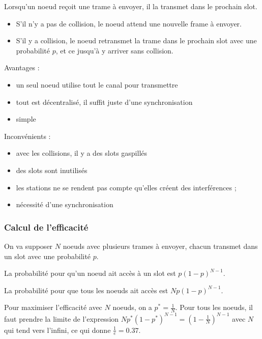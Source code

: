 	Lorsqu'un noeud reçoit une trame à envoyer, il la transmet dans le prochain slot. 
	
	\begin{itemize}
		\item S'il n'y a pas de collision, le noeud attend une nouvelle frame à envoyer. 
		\item S'il y a collision, le noeud retransmet la trame dans le prochain slot avec une probabilité $p$, et ce jusqu'à y arriver sans collision.
	\end{itemize}
	
	
	Avantages :
	
	\begin{itemize}	
		\item un seul noeud utilise tout le canal pour transmettre
		\item tout est décentralisé, il suffit juste d'une synchronisation
		\item simple
	\end{itemize}
	
	Inconvénients :
	
	\begin{itemize}
		\item avec les collisions, il y a des slots gaspillés
		\item des slots sont inutilisés
		\item les stations ne se rendent pas compte qu'elles créent des interférences ;
		\item nécessité d'une synchronisation
	\end{itemize}
	
		\subsubsection{Calcul de l'efficacité}
		
		On va supposer $N$ noeuds avec plusieurs trames à envoyer, chacun transmet dans un slot avec une probabilité $p$.
		
		La probabilité pour qu'un noeud  ait accès à un slot est $p (1 - p)^{N - 1}$.
		
		La probabilité pour que tous les noeuds ait accès est $N p (1 - p)^{N - 1}$.
		
		Pour maximiser l'efficacité avec $N$ noeuds, on a $p^* = \frac{1}{N}$. Pour tous les noeuds, il faut prendre la limite de l'expression $N p^*(1 - p^*)^{N - 1} = (1 - \frac{1}{N})^{N - 1}$ avec $N$ qui tend vers l'infini, ce qui donne $\frac{1}{e} = 0.37$.
		
